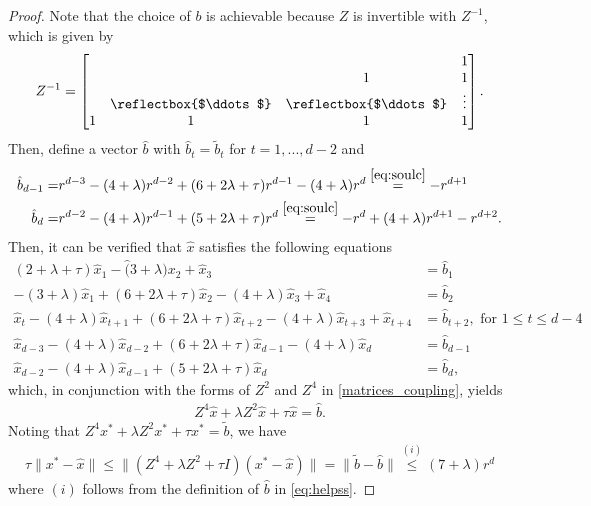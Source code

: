 \documentclass{osudissert96}
\begin{document}
\begin{proof}
Note that the choice of $b$ is achievable because $Z$ is invertible with $Z^{-1}$, which is given by 
\begin{align*}
Z^{-1}= \begin{bmatrix}
 &   &  & 1\\
 &  &  1& 1  \\
  &\text{\reflectbox{$\ddots$}} &\text{\reflectbox{$\ddots
  $}} & \vdots \\
  1& 1  &1  &1 \\ 
\end{bmatrix}.
\end{align*}
Then, define a vector $\hat b$ with $\hat b_t=\widetilde b_t$ for $t=1,...,d-2$ and 
\begin{align}\label{eq:helpss}
\hat b_{d-1} =& r^{d-3} - (4+\lambda) r^{d-2} +(6+2\lambda+\tau)r^{d-1} - (4+\lambda) r^d \overset{\eqref{eq:soulc}}= -r^{d+1}\nonumber
\\ \hat b_d =& r^{d-2} - (4+\lambda) r^{d-1} +(5+2\lambda +\tau) r^d \overset{\eqref{eq:soulc}}= -r^d + (4+\lambda) r^{d+1}-r^{d+2}.
\end{align}
Then, it can be verified that $\hat x$ satisfies the following equations %
\begin{align*}
(2+\lambda +\tau)\hat x_1 - \hat (3+\lambda) x_2 +\hat x_3 &= \hat b_1 \nonumber
\\ -(3+\lambda) \hat x_1 +(6+2\lambda +\tau) \hat x_2 -(4+\lambda) \hat x_3 + \hat x_4 &= \hat b_2 \nonumber
\\ \hat x_t - (4+\lambda)\hat x_{t+1} + (6+2\lambda +\tau) \hat x_{t+2} -(4+\lambda) \hat x_{t+3}+\hat x_{t+4} &= \hat  b_{t+2}, \mbox{ for } 1\leq t\leq d-4  \nonumber
\\ \hat x_{d-3} - (4+\lambda)\hat x_{d-2} +(6+2\lambda +\tau) \hat x_{d-1} -(4+\lambda)\hat x_d &= \hat b_{d-1}\nonumber
\\\hat x_{d-2} -(4+\lambda) \hat x_{d-1} + (5+2\lambda+\tau) \hat x_d &= \hat b_d, 
\end{align*}
which, in conjunction with the forms of  $Z^2$ and $Z^4$ in \cref{matrices_coupling}, yields 
\begin{align*}
Z^4\hat x + \lambda Z^2 \hat x + \tau \hat x  = \hat b.
\end{align*}
Noting that $Z^4 x^* + \lambda Z^2 x^* + \tau x^*  = \widetilde b$, we have
\begin{align*}
\tau \|x^*-\hat x \|\leq \|(Z^4+\lambda Z^2 + \tau I)(x^*-\hat x)\| = \|\widetilde b -\hat b\| \overset{(i)}\leq (7+\lambda) r^d
\end{align*}
where $(i)$ follows from the definition of $\hat b $ in \cref{eq:helpss}. 
\end{proof}
\end{document}
